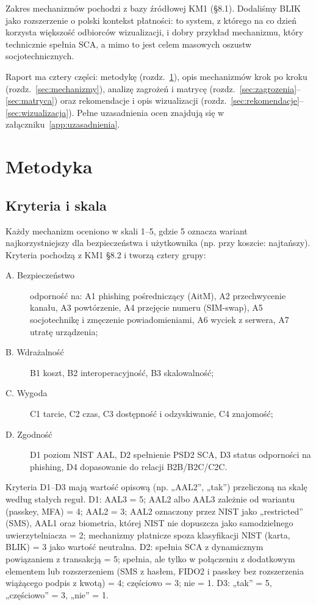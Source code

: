 \documentclass[11pt,a4paper]{article}
\begin{document}
Zakres mechanizmów pochodzi z bazy źródłowej KM1 (§8.1). Dodaliśmy BLIK jako rozszerzenie o polski kontekst płatności: to system, z którego na co dzień korzysta większość odbiorców wizualizacji, i dobry przykład mechanizmu, który technicznie spełnia SCA, a mimo to jest celem masowych oszustw socjotechnicznych.

Raport ma cztery części: metodykę (rozdz.~\ref{sec:metodyka}), opis mechanizmów krok po kroku (rozdz.~\ref{sec:mechanizmy}), analizę zagrożeń i matrycę (rozdz.~\ref{sec:zagrozenia}--\ref{sec:matryca}) oraz rekomendacje i opis wizualizacji (rozdz.~\ref{sec:rekomendacje}--\ref{sec:wizualizacja}). Pełne uzasadnienia ocen znajdują się w załączniku~\ref{app:uzasadnienia}.

\section{Metodyka}\label{sec:metodyka}

\subsection{Kryteria i skala}
Każdy mechanizm oceniono w skali 1--5, gdzie 5 oznacza wariant najkorzystniejszy dla bezpieczeństwa i użytkownika (np. przy koszcie: najtańszy). Kryteria pochodzą z KM1 §8.2 i tworzą cztery grupy:
\begin{description}
  \item[A. Bezpieczeństwo] odporność na: A1 phishing pośredniczący (AitM), A2 przechwycenie kanału, A3 powtórzenie, A4 przejęcie numeru (SIM-swap), A5 socjotechnikę i zmęczenie powiadomieniami, A6 wyciek z serwera, A7 utratę urządzenia;
  \item[B. Wdrażalność] B1 koszt, B2 interoperacyjność, B3 skalowalność;
  \item[C. Wygoda] C1 tarcie, C2 czas, C3 dostępność i odzyskiwanie, C4 znajomość;
  \item[D. Zgodność] D1 poziom NIST AAL, D2 spełnienie PSD2 SCA, D3 status odporności na phishing, D4 dopasowanie do relacji B2B/B2C/C2C.
\end{description}
Kryteria D1--D3 mają wartość opisową (np. „AAL2”, „tak”) przeliczoną na skalę według stałych reguł. D1: AAL3 = 5; AAL2 albo AAL3 zależnie od wariantu (passkey, MFA) = 4; AAL2 = 3; AAL2 oznaczony przez NIST jako „restricted” (SMS), AAL1 oraz biometria, której NIST nie dopuszcza jako samodzielnego uwierzytelniacza = 2; mechanizmy płatnicze spoza klasyfikacji NIST (karta, BLIK) = 3 jako wartość neutralna. D2: spełnia SCA z dynamicznym powiązaniem z transakcją = 5; spełnia, ale tylko w połączeniu z dodatkowym elementem lub rozszerzeniem (SMS z hasłem, FIDO2 i passkey bez rozszerzenia wiążącego podpis z kwotą) = 4; częściowo = 3; nie = 1. D3: „tak” = 5, „częściowo” = 3, „nie” = 1.
\end{document}
